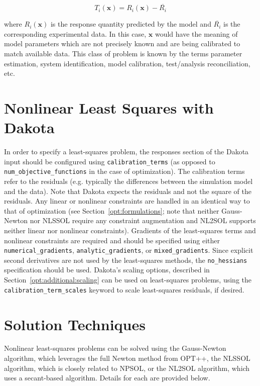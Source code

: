 \begin{equation}
  T_i(\mathbf{x}) = R_i(\mathbf{x})-\overline{R_i}
  \label{nls:equation03}
\end{equation}

where $R_i(\mathbf{x})$ is the response quantity predicted by the
model and $\overline{R_i}$ is the corresponding experimental data.
In this case, $\mathbf{x}$ would have the meaning of model parameters
which are not precisely known and are being calibrated to match
available data. This class of problem is known by the terms parameter
estimation, system identification, model calibration, test/analysis
reconciliation, etc.

\section{Nonlinear Least Squares with Dakota}

In order to specify a least-squares problem, the responses section of
the Dakota input should be configured using
\texttt{calibration\_terms} (as opposed to
\texttt{num\_objective\_functions} in the case of optimization). The
calibration terms refer to the residuals (e.g. typically the
differences between the simulation model and the data). Note that
Dakota expects the residuals and not the square of the residuals. Any
linear or nonlinear constraints are handled in an identical way to
that of optimization (see Section~\ref{opt:formulations}; note that
neither Gauss-Newton nor NLSSOL require any constraint augmentation
and NL2SOL supports neither linear nor nonlinear constraints).
Gradients of the least-squares terms and nonlinear constraints are
required and should be specified using either
\texttt{numerical\_gradients}, \texttt{analytic\_gradients}, or
\texttt{mixed\_gradients}. Since explicit second derivatives are not
used by the least-squares methods, the \texttt{no\_hessians}
specification should be used. Dakota's scaling options, described in
Section~\ref{opt:additional:scaling} can be used on least-squares
problems, using the \texttt{calibration\_term\_scales} keyword to
scale least-squares residuals, if desired.

\section{Solution Techniques}\label{nls:solution}

Nonlinear least-squares problems can be solved using the Gauss-Newton
algorithm, which leverages the full Newton method from OPT++, the
NLSSOL algorithm, which is closely related to NPSOL, or the NL2SOL
algorithm, which uses a secant-based algorithm. Details for each are
provided below.

